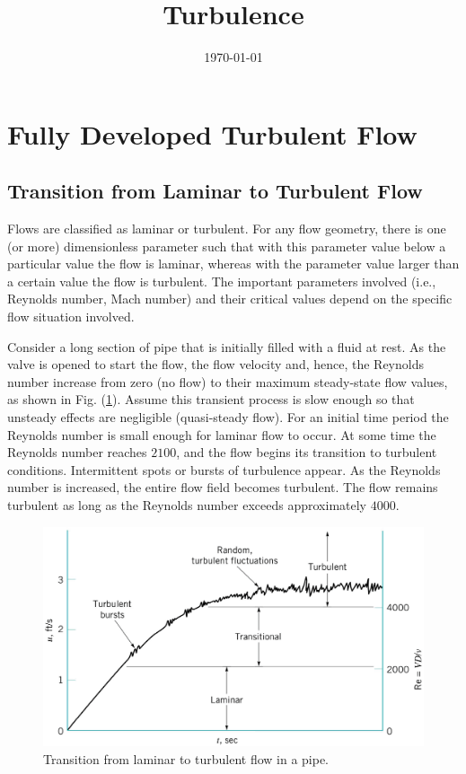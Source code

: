 \documentclass[12pt,a4paper]{article}
\title{Turbulence}
\author{}
\date{\today}
\begin{document}
\maketitle

\section{Fully Developed Turbulent Flow}


\subsection{Transition from Laminar to Turbulent Flow}
\cite{munson2009fundamentals, munson2012fundamentals} Flows are classified as laminar or turbulent. For any flow geometry, there is one (or more) dimensionless parameter such that with this parameter value below a particular value the flow is laminar, whereas with the parameter value larger than a certain value the flow is turbulent. The important parameters involved (i.e., Reynolds number, Mach number) and their critical values depend on the specific flow situation involved.

Consider a long section of pipe that is initially filled with a fluid at rest. As the valve is opened to start the flow, the flow velocity and, hence, the Reynolds number increase from zero (no flow) to their maximum steady-state flow values, as shown in Fig. (\ref{fig:Transition}). Assume this transient process is slow enough so that unsteady effects are negligible (quasi-steady flow). For an initial time period the Reynolds number is small enough for laminar flow to occur. At some time the Reynolds number reaches $2100$, and the flow begins its transition to turbulent conditions. Intermittent spots or bursts of turbulence appear. As the Reynolds number is increased, the entire flow field becomes turbulent. The flow remains turbulent as long as the Reynolds number exceeds approximately $4000$.


\begin{figure}
\centering
\includegraphics[height=8.cm, angle=0]{Transition.eps}
\caption{
Transition from laminar to turbulent flow in a pipe.
}
\label{fig:Transition}
\end{figure}
\end{document}
